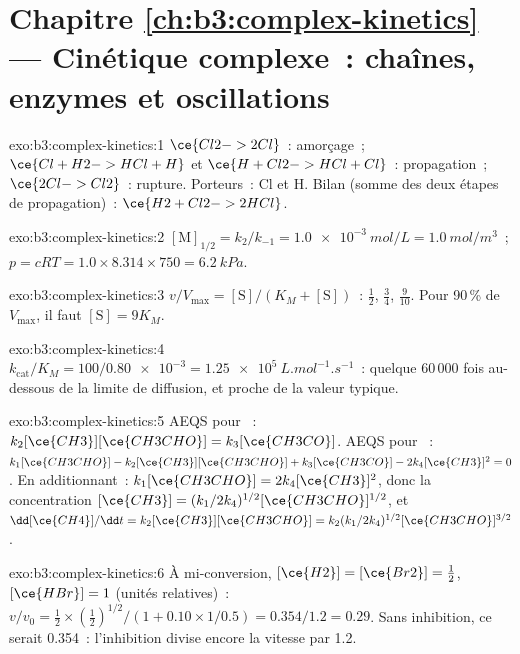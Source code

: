 \section*{Chapitre \ref{ch:b3:complex-kinetics} --- Cinétique complexe~: chaînes, enzymes et oscillations}

\begin{solution}{exo:b3:complex-kinetics:1}
$\ce{Cl2 -> 2 Cl}$~: amorçage~; $\ce{Cl + H2 -> HCl + H}$ et $\ce{H + Cl2 -> HCl + Cl}$~:
propagation~; $\ce{2 Cl -> Cl2}$~: rupture. Porteurs~: Cl et H. Bilan
(somme des deux étapes de propagation)~: $\ce{H2 + Cl2 -> 2 HCl}$.
\end{solution}

\begin{solution}{exo:b3:complex-kinetics:2}
$[\mathrm M]_{1/2} = k_2/k_{-1} = \qty{1.0e-3}{mol/L} = \qty{1.0}{mol/m^3}$~; $p = cRT = 1.0 \times 8.314 \times 750 =
\qty{6.2}{kPa}$.
\end{solution}

\begin{solution}{exo:b3:complex-kinetics:3}
$v/V_{\max} = [\mathrm S]/(K_M + [\mathrm S])$~: $\frac12$, $\frac34$, $\frac{9}{10}$. Pour 90\,\% de $V_{\max}$, il faut $[\mathrm S] = 9K_M$.
\end{solution}

\begin{solution}{exo:b3:complex-kinetics:4}
$k_{\mathrm{cat}}/K_M = 100/\num{0.80e-3} = \qty{1.25e5}{L.mol^{-1}.s^{-1}}$~:
quelque 60\,000 fois au-dessous de la limite de diffusion, et proche de
la valeur typique.
\end{solution}

\begin{solution}{exo:b3:complex-kinetics:5}
AEQS pour ~: $k_2[\ce{CH3}][\ce{CH3CHO}] = k_3[\ce{CH3CO}]$. AEQS pour ~:
$k_1[\ce{CH3CHO}] - k_2[\ce{CH3}][\ce{CH3CHO}] + k_3[\ce{CH3CO}] - 2k_4[\ce{CH3}]^2 = 0$. En additionnant~: $k_1[\ce{CH3CHO}] =
2k_4[\ce{CH3}]^2$, donc la concentration $[\ce{CH3}] = (k_1/2k_4)^{1/2}[\ce{CH3CHO}]^{1/2}$, et $\dd[\ce{CH4}]/\dd t = k_2[\ce{CH3}][\ce{CH3CHO}] =
k_2(k_1/2k_4)^{1/2}[\ce{CH3CHO}]^{3/2}$.
\end{solution}

\begin{solution}{exo:b3:complex-kinetics:6}
À mi-conversion, $[\ce{H2}] = [\ce{Br2}] = \frac12$, $[\ce{HBr}] = 1$
(unités relatives)~:
$v/v_0 = \frac12 \times (\frac12)^{1/2}/(1 + 0.10 \times 1/0.5) = 0.354/1.2 = 0.29$.
Sans inhibition, ce serait
0.354~: l'inhibition divise encore la vitesse par 1.2.
\end{solution}

